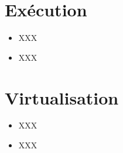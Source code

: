 \section{Ex\'ecution
         {\hfill{} }}

\begin{itemize}
  \item
    XXX
\end{itemize}

\begin{correction}

\begin{itemize}
  \item
    XXX
\end{itemize}

\end{correction}

%
%

\section{Virtualisation
         }

\begin{itemize}
  \item
    XXX
\end{itemize}

\begin{correction}

\begin{itemize}
  \item
    XXX
\end{itemize}

\end{correction}


